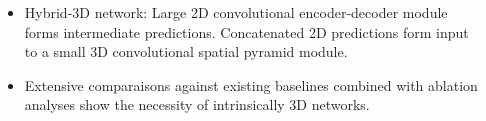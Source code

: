 \documentclass[final]{beamer}
\newlength{\onecolwid}
\newlength{\twocolwid}
\renewcommand{\emph}[1]{{\color{nibib2} #1}}
\begin{document}
\begin{frame}[t]
\begin{columns}[t]
\begin{column}{\twocolwid}
    
    
    \vspace{1ex}
    
    
    
    \vspace{1ex}
    
    \begin{columns}[t]
        
    
    \begin{column}{\onecolwid}
        \begin{tcolorbox}[title=Methods]
            \begin{itemize}
                \item \emph{Hybrid-3D network}: Large 2D convolutional encoder-decoder module  forms intermediate predictions. Concatenated 2D predictions form input to a small 3D convolutional spatial pyramid module.
                \item \emph{Extensive comparaisons against existing baselines} combined with \emph{ablation analyses} show the necessity of intrinsically 3D networks. 
            \end{itemize}
        \end{tcolorbox}
    \end{column}
    \begin{column}{\onecolwid}
    \lipsum
    \end{column}
    

\end{columns}
\end{column}
\end{columns}
\end{frame}
\end{document}
